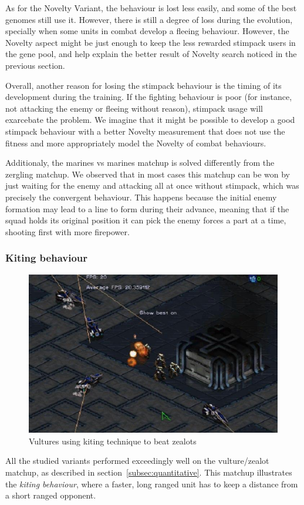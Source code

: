 As for the Novelty Variant, the behaviour is lost less easily, and some
of the best genomes still use it. However, there is still a degree
of loss during the evolution, specially when some units in combat develop
a fleeing behaviour. However, the Novelty aspect might be just enough to
keep the less rewarded stimpack users in the gene pool, and help explain the
better result of Novelty search noticed in the previous section.

Overall, another reason for losing the stimpack behaviour is the timing
of its development during the training. If the fighting behaviour is
poor (for instance, not attacking the enemy or fleeing without
reason), stimpack usage will exarcebate the problem. We imagine that
it might be possible to develop a good stimpack behaviour with a better
Novelty measurement that does not use the fitness and more
appropriately model the Novelty of combat behaviours.

Additionaly, the marines vs marines matchup is solved differently from
the zergling matchup. We observed that in most cases this matchup can
be won by just waiting for the enemy and attacking all at once without
stimpack, which was precisely the convergent behaviour. This happens
because the initial enemy formation may lead to a line to form during
their advance, meaning that if the squad holds its original position
it can pick the enemy forces a part at a time, shooting first with
more firepower.

\subsubsection{Kiting behaviour}

\begin{figure}
    \includegraphics[width=.45\textwidth]{figures/vultures_kiting_screenshot}
    \caption{Vultures using kiting technique to beat
      zealots}\label{fig:vultures_kiting}
\end{figure}

All the studied variants performed exceedingly well on the
vulture/zealot matchup, as described in
section~\ref{subsec:quantitative}. This matchup illustrates the
\emph{kiting behaviour}, where a faster, long ranged unit has to keep a
distance from a short ranged opponent.

